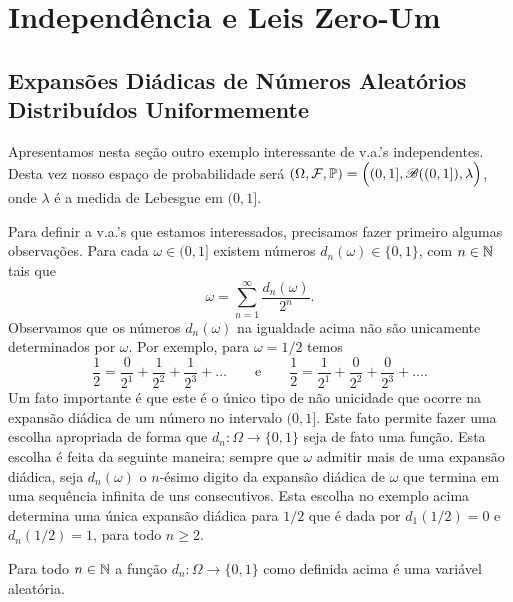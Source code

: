 \chapter[Aula 7]{Independência e Leis Zero-Um}
\chaptermark{}

\section{Expansões Diádicas de Números Aleatórios Distribuídos Uniformemente}

Apresentamos nesta seção outro exemplo interessante
de v.a.'s independentes. Desta vez nosso espaço 
de probabilidade será 
$(\Omega,\mathcal{F},\mathbb{P})=\Big((0,1],\mathscr{B}((0,1]),\lambda\Big)$,
onde $\lambda$ é a medida de Lebesgue em $(0,1]$.

Para definir a v.a.'s que estamos interessados,
precisamos fazer primeiro algumas observações. 
Para cada $\omega\in (0,1]$ existem
números $d_n(\omega)\in\{0,1\}$, com $n\in\mathbb{N}$  
tais que 
	\[
		\omega = \sum_{n=1}^{\infty} \frac{d_n(\omega)}{2^n}.
	\] 
Observamos que os números $d_n(\omega)$ na igualdade 
acima não são unicamente determinados por $\omega$. Por exemplo, 
para $\omega=1/2$ temos 
	\[
		\frac{1}{2} = \frac{0}{2^1}+\frac{1}{2^2}+\frac{1}{2^3}+\ldots
		\qquad
		\text{e}
		\qquad
		\frac{1}{2}= \frac{1}{2^1}+\frac{0}{2^2}+\frac{0}{2^3}+\ldots.
	\]  
Um fato importante é que este é o único tipo 
de não unicidade que ocorre na expansão diádica de um 
número no intervalo $(0,1]$. 
Este fato permite fazer uma escolha apropriada
de forma que $d_n:\Omega\to\{0,1\}$ seja de fato 
uma função. Esta escolha é feita da seguinte maneira:
sempre que $\omega$ admitir mais de uma 
expansão diádica, 
seja $d_n(\omega)$ o $n$-ésimo digito da expansão 
diádica de $\omega$ que termina em uma sequência 
infinita de uns consecutivos.
Esta escolha no exemplo acima determina uma 
única expansão diádica para $1/2$ que é dada por $d_1(1/2)=0$ e
$d_n(1/2)=1$, para todo $n\geq 2$.

\begin{proposicao}
	Para todo $n\in\mathbb{N}$ a função $d_n:\Omega\to\{0,1\}$ 
	como definida acima é uma variável aleatória. 
\end{proposicao}



